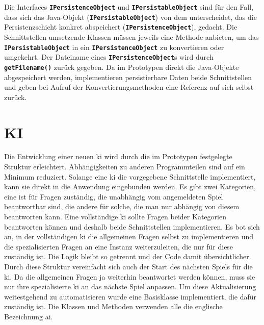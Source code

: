 \documentclass[
							a4paper, 
							11pt, 
							openany, 
							liststotoc,
							parskip=half, 
   							headings=normal
						]{scrreprt}
\begin{document}
{Die Interfaces \textbf{\texttt{IPersistenceObject}} und \textbf{\texttt{IPersistableObject}} sind für den Fall, dass sich das Java-Objekt (\textbf{\texttt{IPersistableObject}}) von dem unterscheidet, das die Persistenzschicht konkret abspeichert (\textbf{\texttt{IPersistenceObject}}), gedacht. Die Schnittstellen umsetzende Klassen müssen jeweils eine Methode anbieten, um das \textbf{\texttt{IPer\-sis\-ta\-ble\-Ob\-ject}} in ein \textbf{\texttt{IPersistenceObject}} zu konvertieren oder umgekehrt.\newline
Der Dateiname eines \textbf{\texttt{IPersistenceObject}}s wird durch \textbf{\texttt{getFilename()}} zurück gegeben.\newline
Da im Prototypen direkt die Java-Objekte abgespeichert werden, implementieren persistierbare Daten beide Schnittstellen und geben bei Aufruf der Konvertierungsmethoden eine Referenz auf sich selbst zurück.

\clearpage

\section{KI} \label{se:anwendung_KI}
Die Entwicklung einer neuen \acs{ki} wird durch die im Prototypen festgelegte Struktur erleichtert. Abhängigkeiten zu anderen Programmteilen sind auf ein Minimum reduziert. Solange eine \acs{ki} die vorgegebene Schnittstelle implementiert, kann sie direkt in die Anwendung eingebunden werden.\newline
Es gibt zwei Kategorien, eine ist für Fragen zuständig, die unabhängig vom angemeldeten Spiel beantwortbar sind, die andere für solche, die man nur abhängig von diesem beantworten kann.\newline
Eine vollständige \acs{ki} sollte Fragen beider Kategorien beantworten können und deshalb beide Schnittstellen implementieren. Es bot sich an, in der vollständigen \acs{ki} die allgemeinen Fragen selbst zu implementieren und die spezialisierten Fragen an eine Instanz weiterzuleiten, die nur für diese zuständig ist. Die Logik bleibt so getrennt und der Code damit übersichtlicher. Durch diese Struktur vereinfacht sich auch der Start des nächsten Spiels für die \acs{ki}. Da die allgemeinen Fragen ja weiterhin beantwortet werden können, muss sie nur ihre spezialisierte \acs{ki} an das nächste Spiel anpassen.
Um diese Aktualisierung weitestgehend zu automatisieren wurde eine Basisklasse implementiert, die dafür zuständig ist.
Die Klassen und Methoden verwenden alle die englische Bezeichnung \acf{ai}.

}
\end{document}
